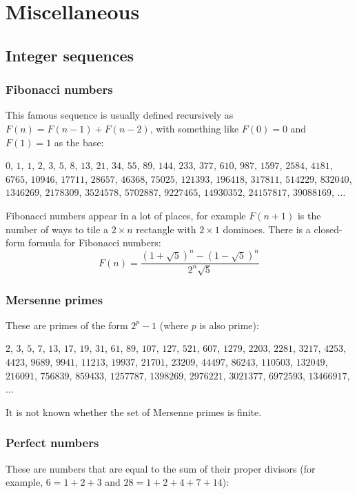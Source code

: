 \documentclass[a4paper,12pt]{article}
\begin{document}
\newpage\section{Miscellaneous}

\subsection{Integer sequences}
\subsubsection{Fibonacci numbers}
This famous sequence is usually defined recursively as $F(n)=F(n-1)+F(n-2)$, with something like $F(0)=0$ and $F(1)=1$ as the base:

\begin{center}$0$, $1$, $1$, $2$, $3$, $5$, $8$, $13$, $21$, $34$, $55$, $89$, $144$, $233$, $377$, $610$, $987$, $1597$, $2584$, $4181$, $6765$, $10946$, $17711$, $28657$, $46368$, $75025$, $121393$, $196418$, $317811$, $514229$, $832040$, $1346269$, $2178309$, $3524578$, $5702887$, $9227465$, $14930352$, $24157817$, $39088169$, $\ldots$\end{center}

Fibonacci numbers appear in a lot of places, for example $F(n+1)$ is the number of ways to tile a $2 \times n$ rectangle with $2 \times 1$ dominoes. There is a closed-form formula for Fibonacci numbers:
\[F(n)=\frac{\left(1+\sqrt{5}\right)^n-\left(1-\sqrt{5}\right)^n}{2^n\sqrt{5}}\]

\subsubsection{Mersenne primes}
These are primes of the form $2^p-1$ (where $p$ is also prime):

\begin{center}$2$, $3$, $5$, $7$, $13$, $17$, $19$, $31$, $61$, $89$, $107$, $127$, $521$, $607$, $1279$, $2203$, $2281$, $3217$, $4253$, $4423$, $9689$, $9941$, $11213$, $19937$, $21701$, $23209$, $44497$, $86243$, $110503$, $132049$, $216091$, $756839$, $859433$, $1257787$, $1398269$, $2976221$, $3021377$, $6972593$, $13466917$, $\ldots$\end{center}

It is not known whether the set of Mersenne primes is finite.

\subsubsection{Perfect numbers}
These are numbers that are equal to the sum of their proper divisors (for example, $6=1+2+3$ and $28=1+2+4+7+14$):
\end{document}

